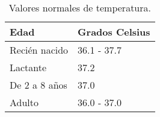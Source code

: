 	\begin{table}[htbp]
		\begin{center}
			\begin{tabular}{|l|l|}
				\hline
				\textbf{Edad} & \textbf{Grados Celsius} \\
				\hline \hline
				Recién nacido & 36.1 - 37.7  \\
				\hline
				Lactante & 37.2  \\
				\hline
				De 2 a 8 años & 37.0  \\
				\hline
				Adulto & 36.0 - 37.0  \\
				\hline
			\end{tabular}
			\caption{Valores normales de temperatura.}
		\end{center}
	\end{table}